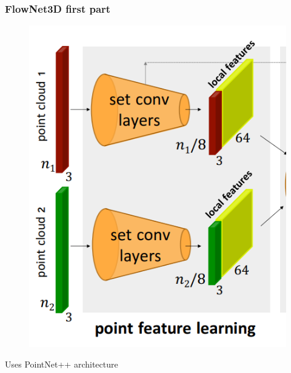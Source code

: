 \documentclass{beamer}
\begin{document}
\begin{frame}[allowframebreaks]
\frametitle{FlowNet3D first part}
\begin{minipage}{\textwidth}
\begin{minipage}{0.45\textwidth}
        \begin{figure}
        \centering        \includegraphics[width=\textwidth,height=0.8\textheight,keepaspectratio]{img/05_FlowNet3D_part1.png}        
        \label{fig:enter-label}
    \end{figure}
    \end{minipage}
    \hfill
    \begin{minipage}{0.45\textwidth}
        Uses PointNet++ architecture
    \end{minipage} 
\end{minipage}
\end{frame}
\end{document}
